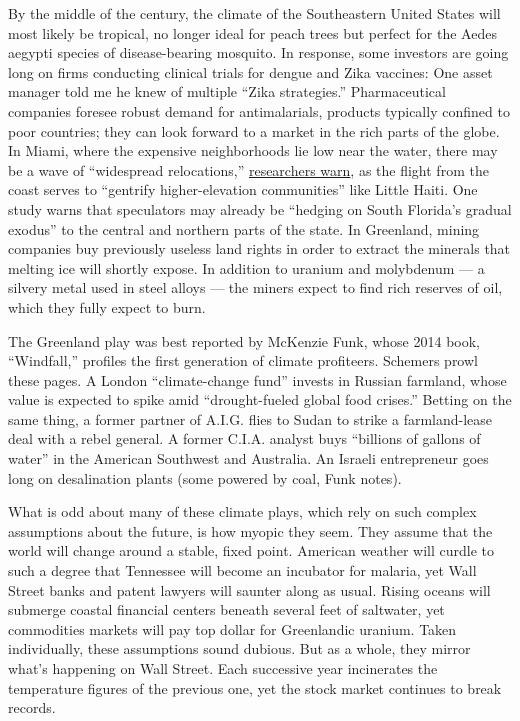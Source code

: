 By the middle of the century, the climate of the Southeastern United
States will most likely be tropical, no longer ideal for peach trees but
perfect for the Aedes aegypti species of disease-bearing mosquito. In
response, some investors are going long on firms conducting clinical
trials for dengue and Zika vaccines: One asset manager told me he knew
of multiple ``Zika strategies.'' Pharmaceutical companies foresee robust
demand for antimalarials, products typically confined to poor countries;
they can look forward to a market in the rich parts of the globe. In
Miami, where the expensive neighborhoods lie low near the water, there
may be a wave of ``widespread relocations,''
\href{https://iopscience.iop.org/article/10.1088/1748-9326/aabb32}{researchers
warn}, as the flight from the coast serves to ``gentrify
higher-elevation communities'' like Little Haiti. One study warns that
speculators may already be ``hedging on South Florida's gradual exodus''
to the central and northern parts of the state. In Greenland, mining
companies buy previously useless land rights in order to extract the
minerals that melting ice will shortly expose. In addition to uranium
and molybdenum --- a silvery metal used in steel alloys --- the miners
expect to find rich reserves of oil, which they fully expect to burn.

The Greenland play was best reported by McKenzie Funk, whose 2014 book,
``Windfall,'' profiles the first generation of climate profiteers.
Schemers prowl these pages. A London ``climate-change fund'' invests in
Russian farmland, whose value is expected to spike amid ``drought-fueled
global food crises.'' Betting on the same thing, a former partner of
A.I.G. flies to Sudan to strike a farmland-lease deal with a rebel
general. A former C.I.A. analyst buys ``billions of gallons of water''
in the American Southwest and Australia. An Israeli entrepreneur goes
long on desalination plants (some powered by coal, Funk notes).

What is odd about many of these climate plays, which rely on such
complex assumptions about the future, is how myopic they seem. They
assume that the world will change around a stable, fixed point. American
weather will curdle to such a degree that Tennessee will become an
incubator for malaria, yet Wall Street banks and patent lawyers will
saunter along as usual. Rising oceans will submerge coastal financial
centers beneath several feet of saltwater, yet commodities markets will
pay top dollar for Greenlandic uranium. Taken individually, these
assumptions sound dubious. But as a whole, they mirror what's happening
on Wall Street. Each successive year incinerates the temperature figures
of the previous one, yet the stock market continues to break records.

